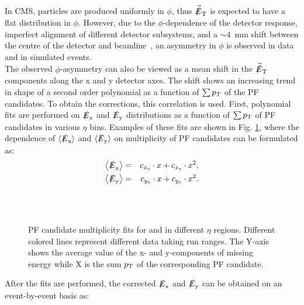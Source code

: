In CMS, particles are produced uniformly in $\phi$, thus $\vec{\slashed{E}}_{\rm T}$ is expected to have a flat distribution in $\phi$. However, due to the $\phi$-dependence of the detector response, imperfect alignment of different detector subsystems, and a $\sim4$~mm shift between the centre of the detector and beamline~\cite{CMS-PAS-TRK-10-003}, an asymmetry in $\phi$ is observed in data and in simulated events.\\
The observed $\phi$-asymmetry can also be viewed as a mean shift in the $\vec{\slashed{E}}_{\rm T}$ components along the x and y detector axes. The shift shows an increasing trend in shape of a second order polynomial as a function of $\sum p_{\rm T}$ of the PF candidates. To obtain the corrections, this correlation is used. First, polynomial fits are performed on $\slashed{E}_{\rm x}$ and $\slashed{E}_{\rm y}$ distributions as a function of $\sum p_{\rm T}$ of PF candidates in various $\eta$ bins. Examples of these fits are shown in Fig. \ref{fig:phiFits}, where the dependence of $\langle\slashed{E}_{\rm x}\rangle$ and $\langle\slashed{E}_{\rm y}\rangle$ 
on multiplicity of PF candidates can be formulated as:
\begin{eqnarray}
\left<\slashed{E}_{\rm x} \right> & = & c_{x_o} \cdot x + c_{x_s} \cdot x^2, \nonumber \\
\left<\slashed{E}_{\rm y} \right> & = & c_{y_o} \cdot x + c_{y_s} \cdot x^2.
\label{eq:metPhiAsymmetryFitModel}
\end{eqnarray}
\begin{figure}[!h]
\begin{center}
 \\
 \\
\caption{
  PF candidate multiplicity fits for \mex and \mey in different $\eta$ regions. Different colored lines represent different data taking run ranges. The Y-axis shows the average value of the x- and y-components of missing energy while X is the sum $p_{\rm T}$ of the corresponding PF candidate.
  }\label{fig:phiFits}
\end{center}
\end{figure}
After the fits are performed, the corrected $\slashed{E}_{\rm x}$ and $\slashed{E}_{\rm y}$ can be obtained on an event-by-event basis as:
